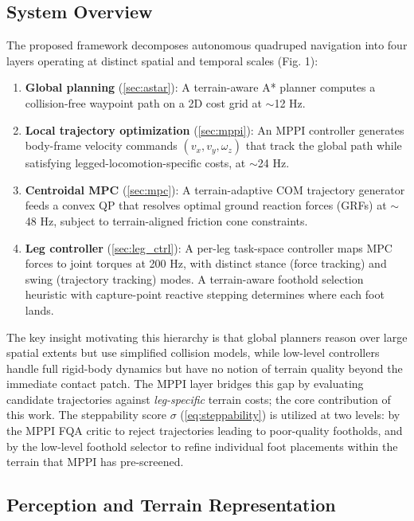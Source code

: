 \documentclass[letterpaper, 10 pt, conference]{ieeeconf}  %
\begin{document}
\subsection{System Overview}
The proposed framework decomposes autonomous quadruped navigation into four layers operating at distinct spatial and temporal scales (Fig. 1):
\begin{enumerate}
    \item \textbf{Global planning} (\ref{sec:astar}): A terrain-aware A* planner computes a collision-free waypoint path on a 2D cost grid at $\sim$12 Hz.
    \item \textbf{Local trajectory optimization} (\ref{sec:mppi}): An MPPI controller generates body-frame velocity commands $(v_x, v_y, \omega_z)$ that track the global path while satisfying legged-locomotion-specific costs, at $\sim$24 Hz.
    \item \textbf{Centroidal MPC} (\ref{sec:mpc}): A terrain-adaptive COM trajectory generator feeds a convex QP that resolves optimal ground reaction forces (GRFs) at $\sim$48 Hz, subject to terrain-aligned friction cone constraints.
    \item \textbf{Leg controller} (\ref{sec:leg_ctrl}): A per-leg task-space controller maps MPC forces to joint torques at 200 Hz, with distinct stance (force tracking) and swing (trajectory tracking) modes. A terrain-aware foothold selection heuristic with capture-point reactive stepping determines where each foot lands.
\end{enumerate}
The key insight motivating this hierarchy is that global planners reason over large spatial extents but use simplified collision models, while low-level controllers handle full rigid-body dynamics but have no notion of terrain quality beyond the immediate contact patch. The MPPI layer bridges this gap by evaluating candidate trajectories against \textit{leg-specific} terrain costs; the core contribution of this work. The steppability score $\sigma$ (\ref{eq:steppability}) is utilized at two levels: by the MPPI FQA critic to reject trajectories leading to poor-quality footholds, and by the low-level foothold selector to refine individual foot placements within the terrain that MPPI has pre-screened.
\subsection{Perception and Terrain Representation}
\end{document}
